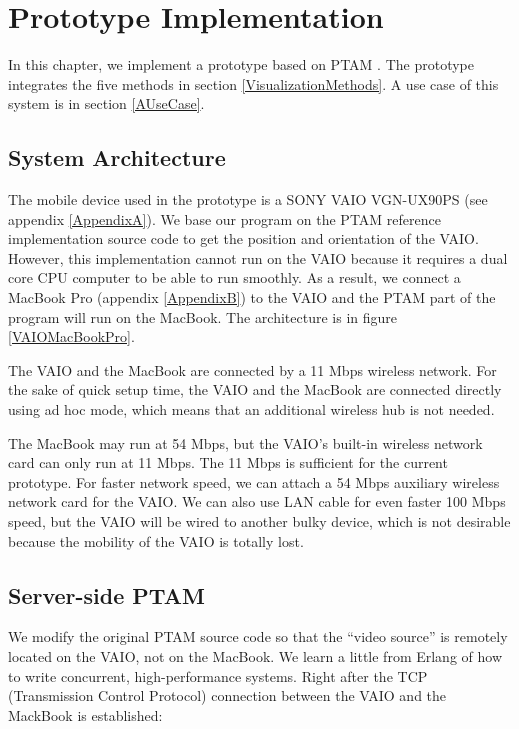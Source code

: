 \chapter{Prototype Implementation}
\label{Chapter4}

In this chapter, we implement a prototype based on PTAM \citep{Reference12}. The prototype integrates the five methods in section \ref{VisualizationMethods}. A use case of this system is in section \ref{AUseCase}.

\section{System Architecture}

The mobile device used in the prototype is a SONY VAIO VGN-UX90PS (see appendix \ref{AppendixA}). We base our program on the PTAM reference implementation source code \citep{Reference16} to get the position and orientation of the VAIO. However, this implementation cannot run on the VAIO because it requires a dual core CPU computer to be able to run smoothly. As a result, we connect a MacBook Pro (appendix \ref{AppendixB}) to the VAIO and the PTAM part of the program will run on the MacBook. The architecture is in figure \ref{VAIOMacBookPro}.

The VAIO and the MacBook are connected by a 11 Mbps wireless network. For the sake of quick setup time, the VAIO and the MacBook are connected directly using ad hoc mode, which means that an additional wireless hub is not needed.

The MacBook may run at 54 Mbps, but the VAIO's built-in wireless network card can only run at 11 Mbps. The 11 Mbps is sufficient for the current prototype. For faster network speed, we can attach a 54 Mbps auxiliary wireless network card for the VAIO. We can also use LAN cable for even faster 100 Mbps speed, but the VAIO will be wired to another bulky device, which is not desirable because the mobility of the VAIO is totally lost.

\section{Server-side PTAM}

We modify the original PTAM source code so that the ``video source'' is remotely located on the VAIO, not on the MacBook. We learn a little from Erlang \citep{Reference17} of how to write concurrent, high-performance systems. Right after the TCP (Transmission Control Protocol) connection between the VAIO and the MackBook is established:

